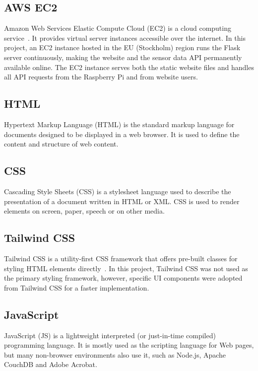 \subsection*{AWS EC2}

Amazon Web Services Elastic Compute Cloud (EC2) is a cloud computing service~\cite{awsec2}. It
provides virtual server instances accessible over the internet. In this project, an EC2 instance
hosted in the EU (Stockholm) region runs the Flask server continuously, making the website and
the sensor data API permanently available online. The EC2 instance serves both the static
website files and handles all API requests from the Raspberry Pi and from website users.

\subsection*{HTML}

Hypertext Markup Language (HTML) is the standard markup language for documents designed to be
displayed in a web browser. It is used to define the content and structure of web content.

\subsection*{CSS}

Cascading Style Sheets (CSS) is a stylesheet language used to describe the presentation of a
document written in HTML or XML. CSS is used to render elements on screen, paper, speech or on
other media.

\subsection*{Tailwind CSS}

Tailwind CSS is a utility-first CSS framework that offers pre-built classes for styling HTML
elements directly~\cite{tailwind}. In this project, Tailwind CSS was not used as the primary
styling framework, however, specific UI components were adopted from Tailwind CSS for a faster
implementation.

\subsection*{JavaScript}

JavaScript (JS) is a lightweight interpreted (or just-in-time compiled) programming language.
It is mostly used as the scripting language for Web pages, but many non-browser environments
also use it, such as Node.js, Apache CouchDB and Adobe Acrobat.

